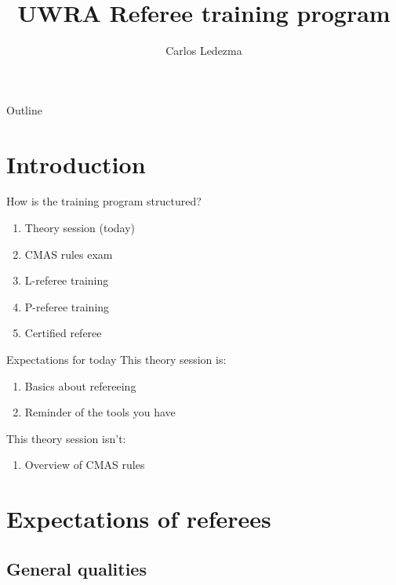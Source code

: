 \documentclass{beamer}
\title{UWRA Referee training program}
\author{Carlos Ledezma}
\begin{document}
\begin{frame}
    \titlepage{}
\end{frame}

\begin{frame}{Outline}
\end{frame}

\section{Introduction}

\begin{frame}{How is the training program structured?}
    \begin{enumerate}
        \item Theory session (today)
        \item CMAS rules exam
        \item L-referee training
        \item P-referee training
        \item Certified referee
    \end{enumerate}
\end{frame}

\begin{frame}{Expectations for today}
    This theory session is:

    \begin{enumerate}
        \item Basics about refereeing
        \item Reminder of the tools you have
    \end{enumerate}

    This theory session isn't:

    \begin{enumerate}
        \item Overview of CMAS rules
    \end{enumerate}
\end{frame}

\section{Expectations of referees}

\subsection{General qualities}


\end{document}
